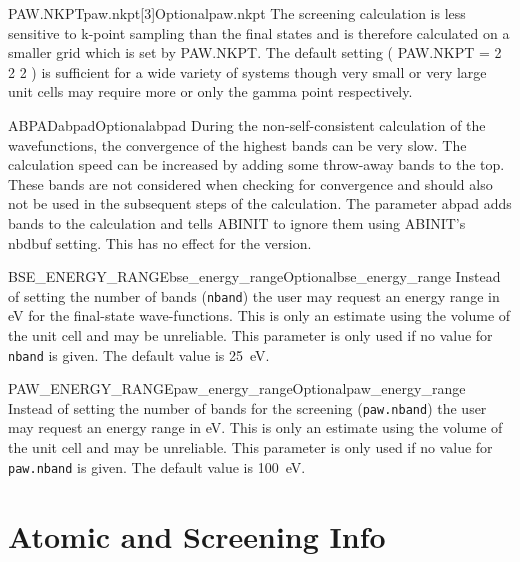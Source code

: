 \documentclass[11pt]{report}
\begin{document}
\begin{Card}{PAW.NKPT}{paw.nkpt[3]}{Optional}{paw.nkpt}
The screening calculation is less sensitive to k-point sampling than the final states and is therefore calculated on a smaller grid which is set by PAW.NKPT. The default setting ( PAW.NKPT = 2 2 2 ) is sufficient for a wide variety of systems though very small or very large unit cells may require more or only the gamma point respectively. 
\end{Card}

\begin{Card}{ABPAD}{abpad}{Optional}{abpad}
During the non-self-consistent calculation of the wavefunctions, the convergence of the highest bands can be very slow. The calculation speed can be increased by adding some throw-away bands to the top. These bands are not considered when checking for convergence and should also not be used in the subsequent steps of the calculation. The parameter abpad adds bands to the calculation and tells ABINIT to ignore them using ABINIT's nbdbuf setting. This has no effect for the  version. 
\end{Card}

\begin{Card}{BSE\_ENERGY\_RANGE}{bse\_energy\_range}{Optional}{bse_energy_range}
Instead of setting the number of bands (\texttt{nband}) the user may request an energy range in eV for the final-state wave-functions. 
This is only an estimate using the volume of the unit cell and may be unreliable. 
This parameter is only used if no value for \texttt{nband} is given. The default value is 25~eV.
\end{Card}

\begin{Card}{PAW\_ENERGY\_RANGE}{paw\_energy\_range}{Optional}{paw_energy_range}
Instead of setting the number of bands for the screening (\texttt{paw.nband}) the user may request an energy range in eV. 
This is only an estimate using the volume of the unit cell and may be unreliable. 
This parameter is only used if no value for \texttt{paw.nband} is given. The default value is 100~eV. 
\end{Card}

\section{Atomic and Screening Info}
\label{sec:AS-Info}
\end{document}
